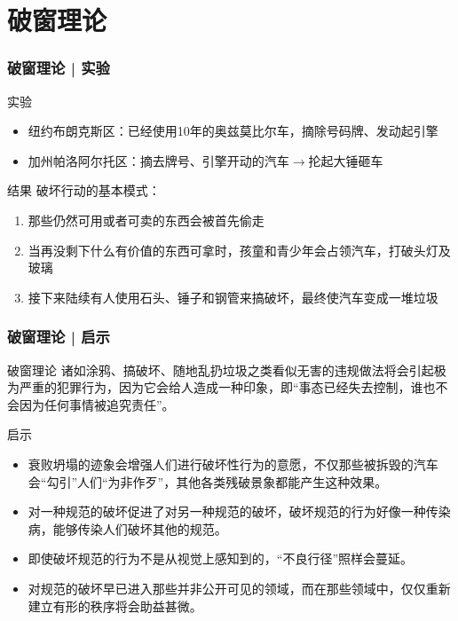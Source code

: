 \section{破窗理论}
\begin{frame}
  \frametitle{破窗理论 | 实验}
  \begin{block}{实验}
    \begin{itemize}
      \item 纽约布朗克斯区：已经使用10年的奥兹莫比尔车，摘除号码牌、发动起引擎
      \item 加州帕洛阿尔托区：摘去牌号、引擎开动的汽车$\longrightarrow$抡起大锤砸车
    \end{itemize}
  \end{block}
  \pause
  \begin{block}{结果}
    破坏行动的基本模式：
    \begin{enumerate}
      \item 那些仍然可用或者可卖的东西会被首先偷走
      \item 当再没剩下什么有价值的东西可拿时，孩童和青少年会占领汽车，打破头灯及玻璃
      \item 接下来陆续有人使用石头、锤子和钢管来搞破坏，最终使汽车变成一堆垃圾
    \end{enumerate}
  \end{block}
\end{frame}

\begin{frame}
  \frametitle{破窗理论 | 启示}
  \begin{block}{破窗理论}
    诸如涂鸦、搞破坏、随地乱扔垃圾之类看似无害的违规做法将会引起极为严重的犯罪行为，因为它会给人造成一种印象，即“事态已经失去控制，谁也不会因为任何事情被追究责任”。
  \end{block}
  \pause
  \begin{block}{启示}
    \begin{itemize}
      \item 衰败坍塌的迹象会增强人们进行破坏性行为的意愿，不仅那些被拆毁的汽车会“勾引”人们“为非作歹”，其他各类残破景象都能产生这种效果。
      \item 对一种规范的破坏促进了对另一种规范的破坏，破坏规范的行为好像一种传染病，能够传染人们破坏其他的规范。
      \item 即使破坏规范的行为不是从视觉上感知到的，“不良行径”照样会蔓延。
      \item 对规范的破坏早已进入那些并非公开可见的领域，而在那些领域中，仅仅重新建立有形的秩序将会助益甚微。
    \end{itemize}
  \end{block}
\end{frame}


